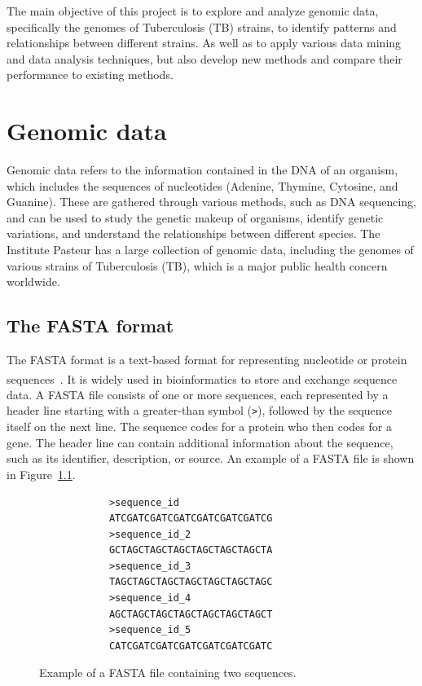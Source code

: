 The main objective of this project is to explore and analyze genomic data, specifically the genomes of Tuberculosis (TB) strains, to
identify patterns and relationships between different strains. As well as to apply various data mining and data analysis techniques,
but also develop new methods and compare their performance to existing methods.

\chapter{Genomic data}
\label{chap:genomic_data}

Genomic data refers to the information contained in the DNA of an organism, which includes the sequences of nucleotides (Adenine, Thymine,
Cytosine, and Guanine). These are gathered through various methods, such as DNA sequencing, and can be used to study the genetic makeup
of organisms, identify genetic variations, and understand the relationships between different species. The Institute Pasteur has a large
collection of genomic data, including the genomes of various strains of Tuberculosis (TB), which is a major public health concern worldwide.

\section{The FASTA format}
\label{sec:fasta_format}

The FASTA format is a text-based format for representing nucleotide or protein
sequences~\textsuperscript{\cite{fasta-format-genbank,wikipedia-fasta-format-2025}}. It is widely used in bioinformatics
to store and exchange sequence data. A FASTA file consists of one or more sequences, each represented by a header line starting with
a greater-than symbol (\texttt{>}), followed by the sequence itself on the next line. The sequence codes for a protein who then codes for a
gene. The header line can contain additional information about the sequence, such as its identifier, description, or source. An example of a
FASTA file is shown in Figure~\ref{fig:fasta_example}.

\begin{center}
	\begin{figure}[H]
		\begin{BVerbatim}
			>sequence_id
			ATCGATCGATCGATCGATCGATCGATCG
			>sequence_id_2
			GCTAGCTAGCTAGCTAGCTAGCTAGCTA
			>sequence_id_3
			TAGCTAGCTAGCTAGCTAGCTAGCTAGC
			>sequence_id_4
			AGCTAGCTAGCTAGCTAGCTAGCTAGCT
			>sequence_id_5
			CATCGATCGATCGATCGATCGATCGATC
		\end{BVerbatim}
		\caption{Example of a FASTA file containing two sequences.}
		\label{fig:fasta_example}
	\end{figure}
\end{center}

